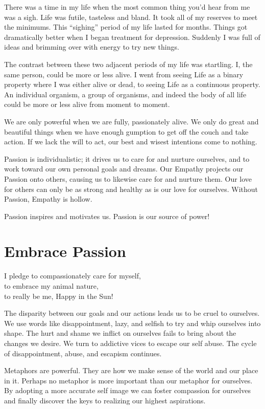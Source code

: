 \documentclass[ebook,12pt,openany,twoside]{memoir}
\newcommand{\imagefacingchapter}[1]{
  \cleartoverso
  \clearpage \null
  \thispagestyle{cleared}
  \AddToShipoutPictureBG*{%
    \AtStockLowerLeft{%
      \texttt{[image: \#1]}
    }
  }
  \clearpage
}
\begin{document}
\noindent There was a time in my life when the most common thing you'd hear
from me was a sigh. Life was futile, tasteless and bland. It took all of my
reserves to meet the minimums. This ``sighing'' period of my life lasted for
months. Things got dramatically better when I began treatment for depression.
Suddenly I was full of ideas and brimming over with energy to try new things.

The contrast between these two adjacent periods of my life was startling. I,
the same person, could be more or less alive. I went from seeing Life as a
binary property where I was either alive or dead, to seeing Life as a
continuous property. An individual organism, a group of organisms, and indeed
the body of all life could be more or less alive from moment to moment.

We are only powerful when we are fully, passionately alive. We only do great
and beautiful things when we have enough gumption to get off the couch and take
action. If we lack the will to act, our best and wisest intentions come to nothing.

Passion is individualistic; it drives us to care for and nurture ourselves, and
to work toward our own personal goals and dreams. Our Empathy projects our
Passion onto others, causing us to likewise care for and nurture them. Our love
for others can only be as strong and healthy as is our love for ourselves.
Without Passion, Empathy is hollow.

Passion inspires and motivates us. Passion is our source of power!

\imagefacingchapter{images/RidingElephant}
\chapter{Embrace Passion}
\setlength\epigraphwidth{3.0in}
\epigraph{
  I pledge to compassionately care for myself,\\
  to embrace my animal nature,\\
  to really be me, Happy in the Sun!
}{}

\noindent The disparity between our goals and our actions leads us to be cruel
to ourselves. We use words like disappointment, lazy, and selfish to try and
whip ourselves into shape. The hurt and shame we inflict on ourselves fails to
bring about the changes we desire. We turn to addictive vices to escape our
self abuse.  The cycle of disappointment, abuse, and escapism continues.

Metaphors are powerful. They are how we make sense of the world and our place
in it. Perhaps no metaphor is more important than our metaphor for ourselves.
By adopting a more accurate self image we can foster compassion for ourselves
and finally discover the keys to realizing our highest aspirations.
\end{document}

